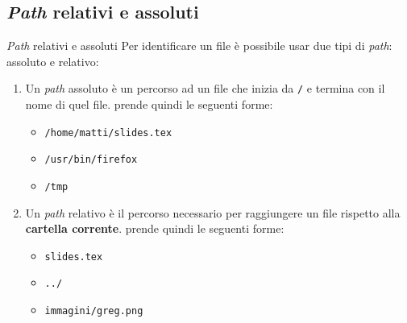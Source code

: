 \subsection{\textit{Path} relativi e assoluti}
\begin{frame}{\textit{Path} relativi e assoluti}
  Per identificare un file è possibile usar due tipi di \textit{path}: assoluto 
  e relativo:
  \begin{enumerate}
    \item Un \textit{path} assoluto è un percorso ad un file che inizia da 
      \texttt{/} e termina con il nome di quel file. prende quindi le seguenti
      forme:
      \begin{itemize}
        \item \texttt{/home/matti/slides.tex}
        \item \texttt{/usr/bin/firefox}
        \item \texttt{/tmp}
      \end{itemize}
    \item Un \textit{path} relativo è il percorso necessario per raggiungere un
      file rispetto alla \textbf{cartella corrente}. prende quindi le seguenti
      forme:
      \begin{itemize}
        \item \texttt{slides.tex}
        \item \texttt{../}
        \item \texttt{immagini/greg.png}
      \end{itemize}
  \end{enumerate}
\end{frame}

